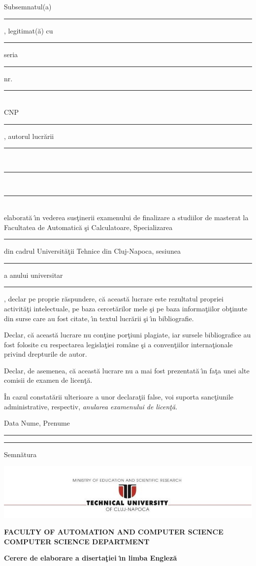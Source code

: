 \documentclass[12pt,a4paper,twoside]{report}
\newcommand{\department}{\bf FACULTY OF AUTOMATION AND COMPUTER SCIENCE\\
COMPUTER SCIENCE DEPARTMENT}
\newcommand{\utcnlogo}{\includegraphics[width=15cm]{img/tucn.jpg}}
\newcommand{\uline}[1]{\rule[0pt]{#1}{0.4pt}}
\begin{document}
Subsemnatul(a) \\
\uline{14.8cm}, 
legitimat(\u{a}) cu \uline{4cm} seria \uline{3cm} nr. \uline{4cm}\\
CNP \uline{9cm}, autorul lucr\u{a}rii \uline{2.8cm}\\
\uline{16cm}\\
\uline{16cm}\\
elaborat\u{a} \^{\i}n vederea sus\c{t}inerii examenului de finalizare a studiilor de masterat la Facultatea de Automatic\u{a} \c{s}i Calculatoare, Specializarea \uline{7cm} din cadrul Universit\u{a}\c{t}ii Tehnice din Cluj-Napoca, sesiunea \uline{4cm} a anului universitar \uline{3cm}, declar pe proprie r\u{a}spundere, c\u{a} aceast\u{a} lucrare este rezultatul propriei activit\u{a}\c{t}i intelectuale, pe baza cercet\u{a}rilor mele \c{s}i pe baza informa\c{t}iilor ob\c{t}inute din surse care au fost citate, \^{\i}n textul lucr\u{a}rii \c{s}i \^{\i}n bibliografie.

Declar, c\u{a} aceast\u{a} lucrare nu con\c{t}ine por\c{t}iuni plagiate, iar sursele bibliografice au fost folosite cu 
respectarea legisla\c{t}iei rom\^{a}ne \c{s}i a conven\c{t}iilor interna\c{t}ionale privind drepturile de autor.

Declar, de asemenea, c\u{a} aceast\u{a} lucrare nu a mai fost prezentat\u{a} \^{\i}n fa\c{t}a unei alte comisii de examen de licen\c{t}\u{a}.

\^{I}n cazul constat\u{a}rii ulterioare a unor declara\c{t}ii false, voi suporta sanc\c{t}iunile administrative, respectiv, \emph{anularea examenului de licen\c{t}\u{a}}.

\vspace{1.5cm}

Data \hspace{8cm} Nume, Prenume

\vspace{0.5cm}

\uline{3cm} \hspace{5cm} \uline{5cm}

\vspace{1cm}
\hspace{9.4cm}Semn\u{a}tura

\thispagestyle{empty}

\thispagestyle{empty}
\newpage

\begin{center}
\utcnlogo

\department
\end{center}

\begin{center}
{\bf
Cerere de elaborare a diserta\c{t}iei \^{\i}n limba Englez\u{a}}
\end{center}
\vspace{0.5cm}
\end{document}
